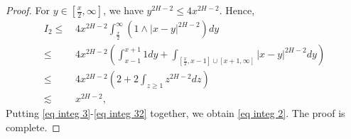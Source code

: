 \documentclass[11pt,reqno]{amsart}
\numberwithin{equation}{section}
\newcommand{\1}{{\bf 1}}
\newcommand{\2}{{\bf 2}}
\begin{document}
\begin{proof}
For    $y\in [\frac{x}2,\infty]$, we have   $y^{2H-2}\le 4x^{2H-2}$.  Hence, 
\begin{equation}\label{eq integ 32}
\begin{split}
{I_2} \le &\,  4 x^{2H-2}\int_{\frac{x}2}^{\infty}\left(1\wedge |x-y|^{2H-2}\right)dy\\
\le &\, 4x^{2H-2} \left(\int_{x-1}^{x+1}1dy+\int_{[\frac{x}2,x-1]\cup [x+1,\infty]}|x-y|^{2H-2}dy\right)\\
\le &\,  4x^{2H-2}\left(2+2\int_{z\ge1} z^{2H-2}dz\right)\\
 \lesssim &\, x^{2H-2},
 \end{split}
\end{equation}
Putting \eqref{eq integ 3}-\eqref{eq integ 32} together, we obtain \eqref{eq integ 2}.
 The proof is complete.  
  \end{proof}
\end{document}
